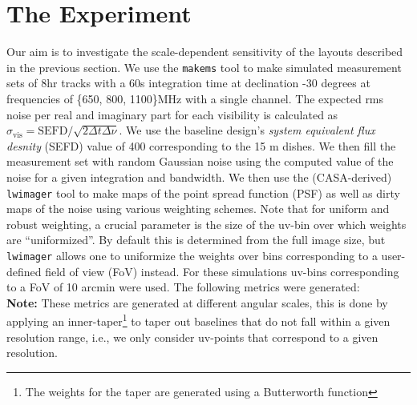 \documentclass[sfheadings,a4paper,times,9pt,floats,floatfix]{article}
\begin{document}
\section{The Experiment}\label{sec:exp}
\vspace{-.2cm}
Our aim is to investigate the scale-dependent sensitivity of the layouts described in the previous section. We use the
\texttt{makems} tool to make simulated measurement sets of 8hr tracks with a 60s integration time at declination -30 degrees
at frequencies of \{650, 800, 1100\}MHz with a single channel. The expected rms noise per real and imaginary part for each
visibility is calculated as $\sigma_{\text{vis}} = \text{SEFD}/\sqrt{2\Delta t\Delta \nu}$. We use the baseline design's {\it
system equivalent flux desnity} (SEFD) value of 400 corresponding to the 15 m dishes. We then fill the measurement set with random
Gaussian noise using the computed value of the noise for a given integration and bandwidth. We then use the (CASA-derived)
\texttt{lwimager} tool to make maps of the point spread function (PSF) as well as dirty maps of the noise using various weighting
schemes. Note that for uniform and robust weighting, a crucial parameter is the size of the uv-bin over which weights are
“uniformized”. By default this is determined from the full image size, but \texttt{lwimager} allows one to uniformize the weights
over bins corresponding to a user-defined field of view (FoV) instead. For these simulations uv-bins corresponding to a FoV of 10
arcmin were used. The following metrics were generated:\\ {\bf Note:} These metrics are generated at different angular scales,
this is done by applying an inner-taper\footnote{The weights for the taper are generated using a Butterworth function } to taper
out baselines that do not fall within a given resolution range, i.e., we only consider uv-points that correspond to a given
resolution.                                                                                         
\end{document}
